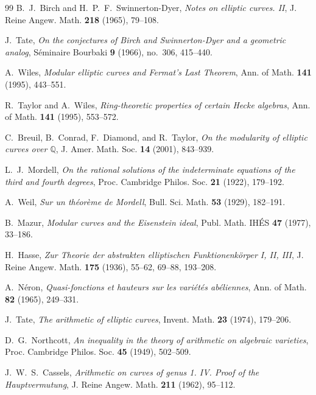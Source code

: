 \documentclass[11pt,reqno]{article}
\theoremstyle{plain}
\theoremstyle{definition}
\begin{document}
\begin{thebibliography}{99}
B.~J.~Birch and H.~P.~F.~Swinnerton-Dyer, \emph{Notes on elliptic curves. II}, J. Reine Angew. Math. \textbf{218} (1965), 79--108.

J.~Tate, \emph{On the conjectures of Birch and Swinnerton-Dyer and a geometric analog}, Séminaire Bourbaki \textbf{9} (1966), no.~306, 415--440.

A.~Wiles, \emph{Modular elliptic curves and Fermat's Last Theorem}, Ann. of Math. \textbf{141} (1995), 443--551.

R.~Taylor and A.~Wiles, \emph{Ring-theoretic properties of certain Hecke algebras}, Ann. of Math. \textbf{141} (1995), 553--572.

C.~Breuil, B.~Conrad, F.~Diamond, and R.~Taylor, \emph{On the modularity of elliptic curves over $\mathbb{Q}$}, J. Amer. Math. Soc. \textbf{14} (2001), 843--939.

L.~J.~Mordell, \emph{On the rational solutions of the indeterminate equations of the third and fourth degrees}, Proc. Cambridge Philos. Soc. \textbf{21} (1922), 179--192.

A.~Weil, \emph{Sur un théorème de Mordell}, Bull. Sci. Math. \textbf{53} (1929), 182--191.

B.~Mazur, \emph{Modular curves and the Eisenstein ideal}, Publ. Math. IHÉS \textbf{47} (1977), 33--186.

H.~Hasse, \emph{Zur Theorie der abstrakten elliptischen Funktionenkörper I, II, III}, J. Reine Angew. Math. \textbf{175} (1936), 55--62, 69--88, 193--208.

A.~Néron, \emph{Quasi-fonctions et hauteurs sur les variétés abéliennes}, Ann. of Math. \textbf{82} (1965), 249--331.

J.~Tate, \emph{The arithmetic of elliptic curves}, Invent. Math. \textbf{23} (1974), 179--206.

D.~G.~Northcott, \emph{An inequality in the theory of arithmetic on algebraic varieties}, Proc. Cambridge Philos. Soc. \textbf{45} (1949), 502--509.

J.~W.~S.~Cassels, \emph{Arithmetic on curves of genus 1. IV. Proof of the Hauptvermutung}, J. Reine Angew. Math. \textbf{211} (1962), 95--112.


\end{thebibliography}
\end{document}

